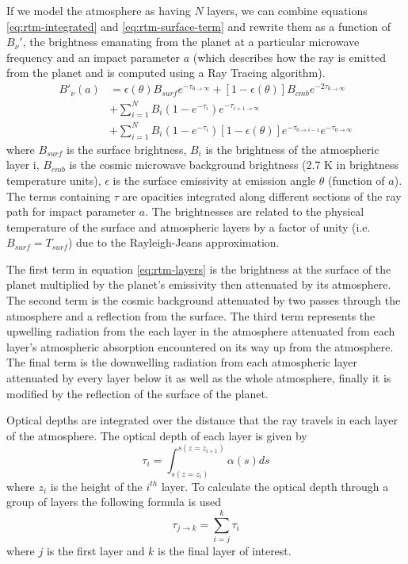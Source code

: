 If we model the atmosphere as having $N$ layers, we can combine equations \ref{eq:rtm-integrated} and \ref{eq:rtm-surface-term} and rewrite them as a function of $B_\nu'$, the brightness emanating from the planet at a particular microwave frequency and an impact parameter $a$ (which describes how the ray is emitted from the planet and is computed using a Ray Tracing algorithm).
\begin{equation}\label{eq:rtm-layers}
\begin{split}
B'_\nu(a) &= \epsilon(\theta)B_{surf} e^{-\tau_{0\rightarrow \infty}} + [1-\epsilon(\theta)]B_{cmb}e^{-2\tau_{0\rightarrow\infty}}\\
&+ \sum_{i=1}^N B_i(1-e^{-\tau_i}) e^{-\tau_{i+1\rightarrow \infty}} \\
&+ \sum_{i=1}^N B_i(1-e^{-\tau_i})[1-\epsilon(\theta)] e^{-\tau_{0\rightarrow i-1}} e^{-\tau_{0\rightarrow \infty}}
\end{split}
\end{equation}
where $B_{surf}$ is the surface brightness, $B_i$ is the brightness of the atmospheric layer i, $B_{cmb}$ is the cosmic microwave background brightness (2.7 K in brightness temperature units), $\epsilon$ is the surface emissivity at emission angle $\theta$ (function of $a$). The terms containing $\tau$ are opacities integrated along different sections of the ray path for impact parameter $a$. The brightnesses are related to the physical temperature of the surface and atmospheric layers by a factor of unity (i.e. $B_{surf}= T_{surf}$) due to the Rayleigh-Jeans approximation. 

The first term in equation \ref{eq:rtm-layers} is the brightness at the surface of the planet multiplied by the planet's emissivity then attenuated by its atmosphere. The second term is the cosmic background attenuated by two passes through the atmosphere and a reflection from the surface. The third term represents the upwelling radiation from the each layer in the atmosphere attenuated from each layer's atmospheric absorption encountered on its way up from the atmosphere. The final term is the downwelling radiation from each atmospheric layer attenuated by every layer below it as well as the whole atmosphere, finally it is modified by the reflection of the surface of the planet. 

Optical depths are integrated over the distance that the ray travels in each layer of the atmosphere. The optical depth of each layer is given by
\begin{equation}\label{eq:rtm-layerdepth}
\tau_i = \int_{s(z=z_i)}^{s(z=z_{i+1})} \alpha(s) ds
\end{equation}
where $z_i$ is the height of the $i^{th}$ layer. To calculate the optical depth through a group of layers the following formula is used
\begin{equation}\label{eq:rtm-layersum}
\tau_{j\rightarrow k} = \sum_{i=j}^k \tau_i
\end{equation}
where $j$ is the first layer and $k$ is the final layer of interest. 

